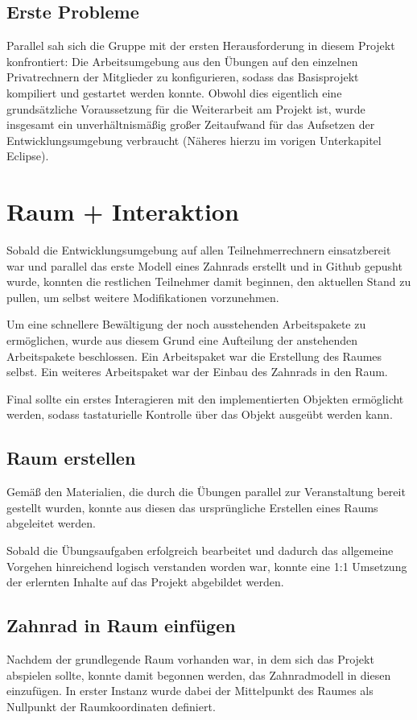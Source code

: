 \documentclass{article}
\begin{document}
\subsection{Erste Probleme}
Parallel sah sich die Gruppe mit der ersten Herausforderung in diesem Projekt konfrontiert: 
Die Arbeitsumgebung aus den Übungen auf den einzelnen Privatrechnern der Mitglieder zu konfigurieren, sodass das Basisprojekt kompiliert und gestartet werden konnte. 
Obwohl dies eigentlich eine grundsätzliche Voraussetzung für die Weiterarbeit am Projekt ist, wurde insgesamt ein unverhältnismäßig großer Zeitaufwand für das Aufsetzen der Entwicklungsumgebung verbraucht (Näheres hierzu im vorigen Unterkapitel Eclipse). 



\section{Raum + Interaktion}
Sobald die Entwicklungsumgebung auf allen Teilnehmerrechnern einsatzbereit war und parallel das erste Modell eines Zahnrads erstellt und in Github gepusht wurde, konnten die restlichen Teilnehmer damit beginnen, den aktuellen Stand zu pullen, um selbst weitere Modifikationen vorzunehmen. 

Um eine schnellere Bewältigung der noch ausstehenden Arbeitspakete zu ermöglichen, wurde aus diesem Grund eine Aufteilung der anstehenden Arbeitspakete beschlossen. 
Ein Arbeitspaket war die Erstellung des Raumes selbst. 
Ein weiteres Arbeitspaket war der Einbau des Zahnrads in den Raum. 

Final sollte ein erstes Interagieren mit den implementierten Objekten ermöglicht werden, sodass tastaturielle Kontrolle über das Objekt ausgeübt werden kann. 



\subsection{Raum erstellen}
Gemäß den Materialien, die durch die Übungen parallel zur Veranstaltung bereit gestellt wurden, konnte aus diesen das ursprüngliche Erstellen eines Raums abgeleitet werden. 

Sobald die Übungsaufgaben erfolgreich bearbeitet und dadurch das allgemeine Vorgehen hinreichend logisch verstanden worden war, konnte eine 1:1 Umsetzung der erlernten Inhalte auf das Projekt abgebildet werden. 



\subsection{Zahnrad in Raum einfügen}
Nachdem der grundlegende Raum vorhanden war, in dem sich das Projekt abspielen sollte, konnte damit begonnen werden, das Zahnradmodell in diesen einzufügen. 
In erster Instanz wurde dabei der Mittelpunkt des Raumes als Nullpunkt der Raumkoordinaten definiert. 
\end{document}
